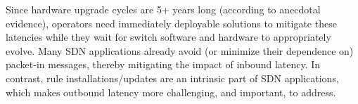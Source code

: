 


Since hardware upgrade cycles are 5+ years long (according to anecdotal
evidence), operators need immediately deployable solutions to 
mitigate these latencies while they wait for switch software and hardware to
appropriately evolve. 
Many SDN applications already avoid (or minimize their dependence on) packet-in 
messages, thereby mitigating the impact of inbound latency. In contrast, rule
installations/updates are an intrinsic part of SDN applications, which makes
outbound latency more challenging, and important, to address.


